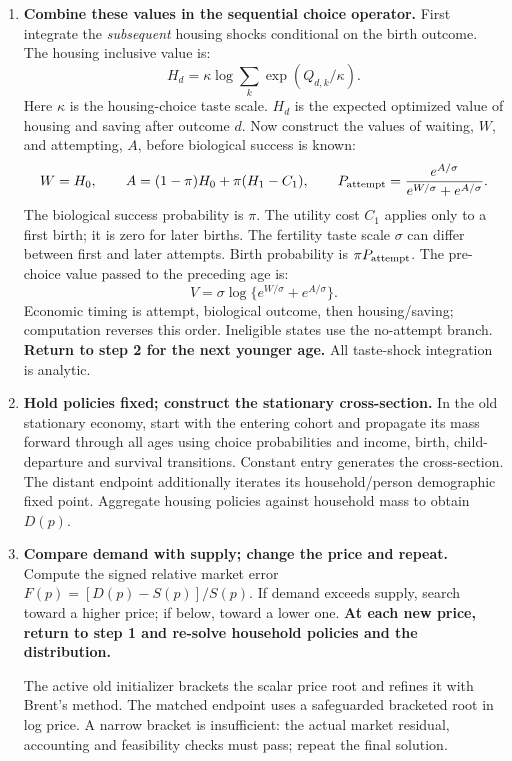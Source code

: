 \documentclass[10pt]{article}
\newcommand{\lead}[1]{\textbf{\color{ink}#1}}
\begin{document}
\begin{enumerate}
\item \lead{Combine these values in the sequential choice operator.}
First integrate the \emph{subsequent} housing shocks conditional on the birth outcome. The housing inclusive value is:
\[
 H_d=\kappa\log\sum_k\exp(Q_{d,k}/\kappa).
\]
Here $\kappa$ is the housing-choice taste scale. $H_d$ is the expected optimized value of housing and saving after outcome $d$. Now construct the values of waiting, $W$, and attempting, $A$, before biological success is known:
\[
 W=H_0,\qquad A=(1-\pi)H_0+\pi(H_1-C_1),\qquad
 P_{\rm attempt}=\frac{e^{A/\sigma}}{e^{W/\sigma}+e^{A/\sigma}}.
\]
The biological success probability is $\pi$. The utility cost $C_1$ applies only to a first birth; it is zero for later births. The fertility taste scale $\sigma$ can differ between first and later attempts. Birth probability is $\pi P_{\rm attempt}$. The pre-choice value passed to the preceding age is:
\[
 V=\sigma\log\{e^{W/\sigma}+e^{A/\sigma}\}.
\]
Economic timing is attempt, biological outcome, then housing/saving; computation reverses this order. Ineligible states use the no-attempt branch. \textbf{Return to step 2 for the next younger age.} All taste-shock integration is analytic.

\item \lead{Hold policies fixed; construct the stationary cross-section.}
In the old stationary economy, start with the entering cohort and propagate its mass forward through all ages using choice probabilities and income, birth, child-departure and survival transitions. Constant entry generates the cross-section. The distant endpoint additionally iterates its household/person demographic fixed point. Aggregate housing policies against household mass to obtain $D(p)$.

\item \lead{Compare demand with supply; change the price and repeat.}
Compute the signed relative market error $F(p)=[D(p)-S(p)]/S(p)$. If demand exceeds supply, search toward a higher price; if below, toward a lower one. \textbf{At each new price, return to step 1 and re-solve household policies and the distribution.}

The active old initializer brackets the scalar price root and refines it with Brent's method. The matched endpoint uses a safeguarded bracketed root in log price. A narrow bracket is insufficient: the actual market residual, accounting and feasibility checks must pass; repeat the final solution.
\end{enumerate}
\end{document}
